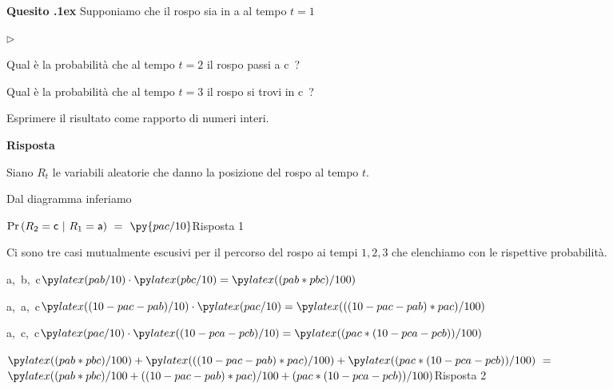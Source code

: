 \documentclass[11pt,twoside,a4paper]{article}
\newcommand{\mylabel}[1]{#1\hfill}
\renewenvironment{itemize}
  {\begin{list}{$\triangleright$}{%
   \setlength{\parskip}{0mm}
   \setlength{\topsep}{.4\baselineskip}
   \setlength{\rightmargin}{0mm}
   \setlength{\listparindent}{0mm}
   \setlength{\itemindent}{0mm}
   \setlength{\labelwidth}{2ex}
   \setlength{\itemsep}{.4\baselineskip}
   \setlength{\parsep}{0mm}
   \setlength{\partopsep}{0mm}
   \setlength{\labelsep}{1ex}
   \setlength{\leftmargin}{\labelwidth+\labelsep}
   \let\makelabel\mylabel}}{%
   \end{list}\vspace*{-1.3mm}}
\newcounter{quesito}
\newenvironment{question}{\bigskip\addtocounter{quesito}{1}\bigskip\bigskip\par\textbf{Quesito \thequesito.\kern1ex}}{\vspace{\parskip}}
\newenvironment{answer}{\par\textbf{Risposta\quad}}{\vspace{\parskip}}
\begin{document}
\begin{question}
Supponiamo che il rospo sia in {\sf a} al tempo $t=1$ 

\begin{itemize}
\item[1.] Qual è la probabilità che al tempo $t=2$ il rospo passi a {\sf c}~?

\item[3.] Qual è la probabilità che al tempo $t=3$ il rospo si trovi in {\sf c}~?

\end{itemize}

Esprimere il risultato come rapporto di numeri interi.

\begin{answer}

Siano $R_t$ le variabili aleatorie che danno la posizione del rospo al tempo $t$.

Dal diagramma inferiamo 

$\Pr(R_{2}={\sf c}~|~R_1={\sf a})\ =\kern1.2ex${\color{blue}$\py{pac/10}$\hfill Risposta 1}


Ci sono tre casi mutualmente escusivi per il percorso del rospo ai tempi $1,2,3$ 
che elenchiamo con le rispettive probabilità.

{\sf a,\ b,\ c}\hfill$\pyl{pab/10}\cdot\pyl{pbc/10} = \pyl{(pab * pbc) / 100}$

{\sf a,\ a,\ c}\hfill$\pyl{(10-pac-pab)/10}\cdot\pyl{pac/10} = \pyl{((10-pac-pab) * pac)/100}$

{\sf a,\ c,\ c}\hfill$\pyl{pac/10}\cdot\pyl{(10-pca-pcb)/10} = \pyl{(pac * (10-pca-pcb))/100}$


$\pyl{(pab * pbc) / 100} + \pyl{((10-pac-pab) * pac)/100} +  \pyl{(pac * (10-pca-pcb))/100} 
\ =\ $
{\color{blue}$\pyl{ (pab * pbc) / 100 + ((10-pac-pab) * pac)/100 +  (pac * (10-pca-pcb))/100}$\hfill Risposta 2}

\end{answer}
\end{question}
  
  
\end{document}
